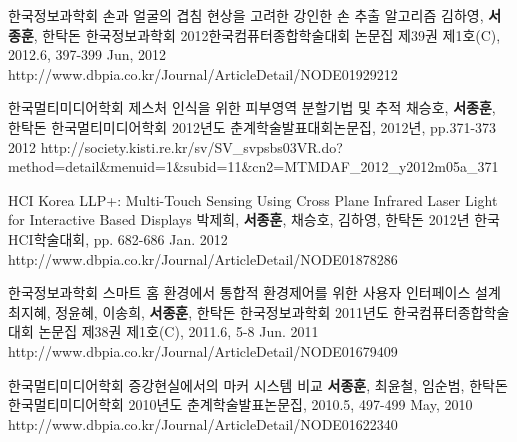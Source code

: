 \begin{cventries}
  \cvpublicationentry
    {한국정보과학회} %
    {손과 얼굴의 겹침 현상을 고려한 강인한 손 추출 알고리즘} %
    {김하영, \textbf{서종훈}, 한탁돈} %
    {한국정보과학회 2012한국컴퓨터종합학술대회 논문집 제39권 제1호(C), 2012.6, 397-399}
    {Jun, 2012} %
    {http://www.dbpia.co.kr/Journal/ArticleDetail/NODE01929212}

  \cvpublicationentry
    {한국멀티미디어학회} %
    {제스처 인식을 위한 피부영역 분할기법 및 추적} %
    {채승호, \textbf{서종훈}, 한탁돈} %
    {한국멀티미디어학회 2012년도 춘계학술발표대회논문집, 2012년, pp.371-373}
    {2012} %
    {http://society.kisti.re.kr/sv/SV\_svpsbs03VR.do?method=detail\&menuid=1\&subid=11\&cn2=MTMDAF\_2012\_y2012m05a\_371}

  \cvpublicationentry
    {HCI Korea} %
    {LLP+: Multi-Touch Sensing Using Cross Plane Infrared Laser Light for Interactive Based Displays} %
    {박제희, \textbf{서종훈}, 채승호, 김하영, 한탁돈} %
    {2012년 한국 HCI학술대회, pp. 682-686}
    {Jan. 2012} %
    {http://www.dbpia.co.kr/Journal/ArticleDetail/NODE01878286}

  \cvpublicationentry
    {한국정보과학회} %
    {스마트 홈 환경에서 통합적 환경제어를 위한 사용자 인터페이스 설계} %
    {최지혜, 정윤혜, 이송희, \textbf{서종훈}, 한탁돈} %
    {한국정보과학회 2011년도 한국컴퓨터종합학술대회 논문집 제38권 제1호(C), 2011.6, 5-8}
    {Jun. 2011} %
    {http://www.dbpia.co.kr/Journal/ArticleDetail/NODE01679409}

  \cvpublicationentry
    {한국멀티미디어학회} %
    {증강현실에서의 마커 시스템 비교} %
    {\textbf{서종훈}, 최윤철, 임순범, 한탁돈} %
    {한국멀티미디어학회 2010년도 춘계학술발표논문집, 2010.5, 497-499}
    {May, 2010} %
    {http://www.dbpia.co.kr/Journal/ArticleDetail/NODE01622340}


\end{cventries}
